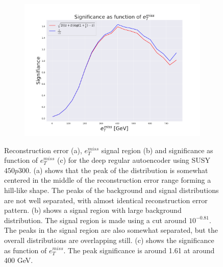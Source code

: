\begin{figure}[h!]
    \hfill 
    \begin{subfigure}{.49\textwidth}
        \includegraphics[width=\textwidth]{Figures/VAE_testing/big/2lep/significance_etmiss_450p0p0300_-0.8121874101107931.pdf}
        \caption{}
        \label{fig:VAE_2lep_big_signi_450}
    \end{subfigure}
    \hfill      
    \caption[2lep deep network | $450p300$ | VAE]{Reconstruction error (a), $e_T^{miss}$ signal region (b) and significance as function of 
    $e_T^{miss}$ (c) for the deep regular autoencoder using SUSY $450p300$. 
    (a) shows that the peak of the distribution is somewhat centered in the middle 
    of the reconstruction error range forming a hill-like shape. The peaks of the background and signal 
    distributions are not well separated, with almost identical reconstruction error pattern. (b) 
    shows a signal region with large background distribution. The signal region is made using a cut around
    $10^{-0.81}$. The peaks in the signal region are also somewhat 
    separated, but the overall distributions are overlapping still. 
    (c) shows the significance as function of $e_T^{miss}$. 
    The peak significance is around 1.61 at around 400 GeV.}
    \label{fig:VAE_2lep_big_rec_sig_signi_450}
\end{figure}

